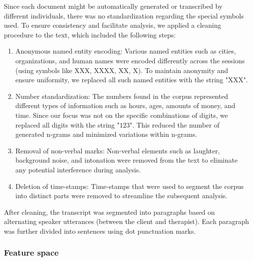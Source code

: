 \documentclass[preprint,12pt]{elsarticle}
\begin{document}
Since each document might be automatically generated or transcribed by different individuals, there was no standardization regarding the special symbols used. To ensure consistency and facilitate analysis, we applied a cleaning procedure to the text, which included the following steps:
\begin{enumerate}
    \item 
Anonymous named entity encoding: Various named entities such as cities, organizations, and human names were encoded differently across the sessions (using symbols like XXX, XXXX, XX, X). To maintain anonymity and ensure uniformity, we replaced all such named entities with the string "XXX".

\item
Number standardization: The numbers found in the corpus represented different types of information such as hours, ages, amounts of money, and time. Since our focus was not on the specific combinations of digits, we replaced all digits with the string "$123$". This reduced the number of generated n-grams and minimized variations within n-grams.

\item
Removal of non-verbal marks: Non-verbal elements such as laughter, background noise, and intonation were removed from the text to eliminate any potential interference during analysis.

\item
Deletion of time-stamps: Time-stamps that were used to segment the corpus into distinct parts were removed to streamline the subsequent analysis.
\end{enumerate}

After cleaning, the transcript was segmented into paragraphs based on alternating speaker utterances (between the client and therapist). Each paragraph was further divided into sentences using dot punctuation marks. 

\subsubsection{Feature space}
\end{document}
